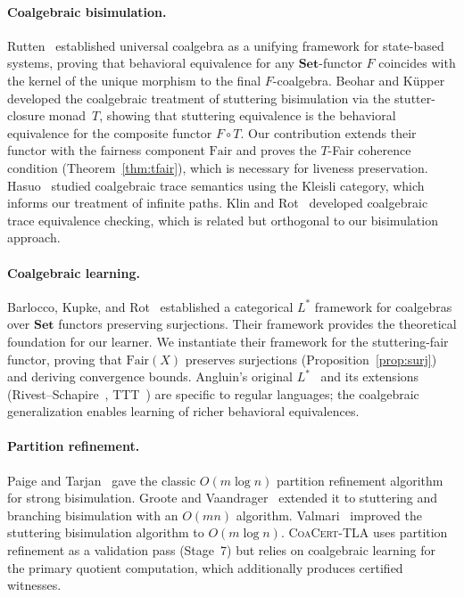 \documentclass[11pt]{article}
\newcommand{\Set}{\mathbf{Set}}
\newcommand{\Fair}{\ensuremath{\mathrm{Fair}}}
\newcommand{\TFair}{$T$-Fair}
\newcommand{\CoaCert}{\textsc{CoaCert-TLA}}
\begin{document}
\paragraph{Coalgebraic bisimulation.}
Rutten~\cite{Rutten00} established universal coalgebra as a unifying
framework for state-based systems, proving that behavioral equivalence
for any $\Set$-functor $F$ coincides with the kernel of the unique
morphism to the final $F$-coalgebra.
Beohar and K\"upper~\cite{BeoharK17} developed the coalgebraic treatment of
stuttering bisimulation via the stutter-closure monad~$T$, showing that
stuttering equivalence is the behavioral equivalence for the composite
functor $F \circ T$.
Our contribution extends their functor with the fairness component $\Fair$
and proves the \TFair{} coherence condition (Theorem~\ref{thm:tfair}),
which is necessary for liveness preservation.
Hasuo~\cite{Hasuo06} studied coalgebraic trace semantics using
the Kleisli category, which informs our treatment of infinite paths.
Klin and Rot~\cite{KlinR16} developed coalgebraic trace equivalence
checking, which is related but orthogonal to our bisimulation approach.

\paragraph{Coalgebraic learning.}
Barlocco, Kupke, and Rot~\cite{BarloccoKR19} established a categorical
$L^*$ framework for coalgebras over $\Set$ functors preserving surjections.
Their framework provides the theoretical foundation for our learner.
We instantiate their framework for the stuttering-fair functor, proving that
$\Fair(X)$ preserves surjections (Proposition~\ref{prop:surj}) and
deriving convergence bounds.
Angluin's original $L^*$~\cite{Angluin87} and its extensions
(Rivest--Schapire~\cite{RivestS93}, TTT~\cite{IsbernMP14}) are specific
to regular languages; the coalgebraic generalization enables learning of
richer behavioral equivalences.

\paragraph{Partition refinement.}
Paige and Tarjan~\cite{PaigeTarjan87} gave the classic $O(m \log n)$
partition refinement algorithm for strong bisimulation.
Groote and Vaandrager~\cite{GrooteV90} extended it to stuttering and
branching bisimulation with an $O(mn)$ algorithm.
Valmari~\cite{Valmari09} improved the stuttering bisimulation algorithm
to $O(m \log n)$.
\CoaCert{} uses partition refinement as a validation pass (Stage~7) but
relies on coalgebraic learning for the primary quotient computation,
which additionally produces certified witnesses.
\end{document}
